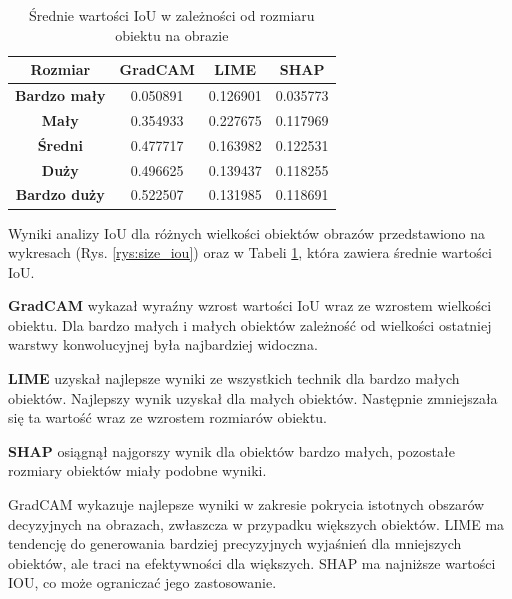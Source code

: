 \begin{table}[h]
	\centering
	\begin{tabular}{|c|c|c|c|}
		\hline
		\textbf{Rozmiar}     & \textbf{GradCAM} & \textbf{LIME} & \textbf{SHAP} \\
		\hline
		\textbf{Bardzo mały} & 0.050891         & 0.126901      & 0.035773      \\
		\hline
		\textbf{Mały}        & 0.354933         & 0.227675      & 0.117969      \\
		\hline
		\textbf{Średni}      & 0.477717         & 0.163982      & 0.122531      \\
		\hline
		\textbf{Duży}        & 0.496625         & 0.139437      & 0.118255      \\
		\hline
		\textbf{Bardzo duży} & 0.522507         & 0.131985      & 0.118691      \\
		\hline
	\end{tabular}
	\caption{Średnie wartości IoU w zależności od rozmiaru obiektu na obrazie}
	\label{tab:size_iou}
\end{table}

Wyniki analizy IoU dla różnych wielkości obiektów obrazów przedstawiono na wykresach (Rys. \ref{rys:size_iou}) oraz w Tabeli \ref{tab:size_iou}, która zawiera średnie wartości IoU.

\textbf{GradCAM} wykazał wyraźny wzrost wartości IoU wraz ze wzrostem wielkości obiektu.
Dla bardzo małych i małych obiektów zależność od wielkości ostatniej warstwy konwolucyjnej była najbardziej widoczna.

\textbf{LIME} uzyskał najlepsze wyniki ze wszystkich technik dla bardzo małych obiektów.
Najlepszy wynik uzyskał dla małych obiektów.
Następnie zmniejszała się ta wartość wraz ze wzrostem rozmiarów obiektu.

\textbf{SHAP} osiągnął najgorszy wynik dla obiektów bardzo małych, pozostałe rozmiary obiektów miały podobne wyniki.

GradCAM wykazuje najlepsze wyniki w zakresie pokrycia istotnych obszarów decyzyjnych na obrazach, zwłaszcza w przypadku większych obiektów.
LIME ma tendencję do generowania bardziej precyzyjnych wyjaśnień dla mniejszych obiektów, ale traci na efektywności dla większych.
SHAP ma najniższe wartości IOU, co może ograniczać jego zastosowanie.

\vspace{1cm}



